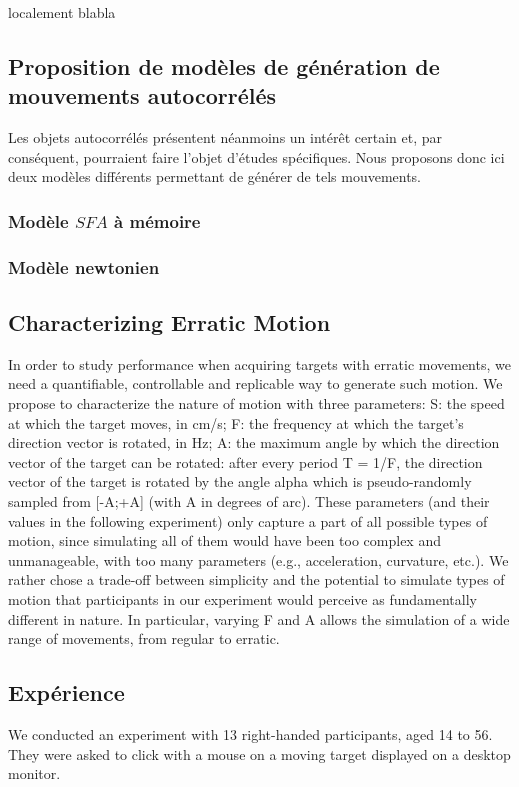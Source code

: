     localement blabla
    
    \subsection{Proposition de modèles de génération de mouvements autocorrélés}
    Les objets autocorrélés présentent néanmoins un intérêt certain et, par conséquent, pourraient faire l'objet d'études spécifiques. Nous proposons donc ici deux modèles différents permettant de générer de tels mouvements.
    
    \subsubsection{Modèle $SFA$ à mémoire}
    
    \subsubsection{Modèle newtonien}

\subsection{Characterizing Erratic Motion}
In order to study performance when acquiring targets with erratic movements, we
need a quantifiable, controllable and replicable way to generate such motion. We
propose to characterize the nature of motion with three parameters:
 S: the speed at which the target moves, in cm/s;
 F: the frequency at which the target's direction vector is rotated, in Hz;
 A: the maximum angle by which the direction vector of the target can be rotated:
after every period T = 1/F, the direction vector of the target is rotated by the angle
alpha which is pseudo-randomly sampled from [-A;+A] (with A in degrees of arc).
These parameters (and their values in the following experiment) only capture a part
of all possible types of motion, since simulating all of them would have been too
complex and unmanageable, with too many parameters (e.g., acceleration, curvature,
etc.). We rather chose a trade-off between simplicity and the potential to simulate
types of motion that participants in our experiment would perceive as fundamentally
different in nature. In particular, varying F and A allows the simulation of a wide
range of movements, from regular to erratic.

\subsection{Expérience}
We conducted an experiment with 13 right-handed participants, aged 14 to 56. They
were asked to click with a mouse on a moving target displayed on a desktop monitor.

